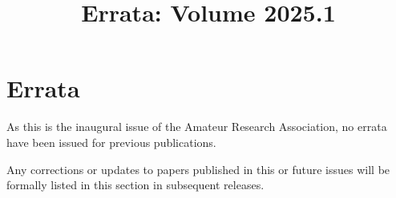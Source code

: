 \documentclass[conference, compsoc, 11pt]{IEEEtran}
\title{Errata: Volume 2025.1}
\author{
    \IEEEauthorblockN{Ivan Anishchuk}
    \IEEEauthorblockA{
        Editor-in-Chief, Amateur Research Association\\
        ORCID \orcidicon{0000-0000-0000-0000}: 0000-0000-0000-0000 %
    }
}
\begin{document}
\IEEEoverridecommandlockouts
{}

\maketitle

\IEEEpubidadjcol

\section*{Errata}

As this is the inaugural issue of the Amateur Research Association, no errata have been issued for previous publications.

Any corrections or updates to papers published in this or future issues will be formally listed in this section in subsequent releases.
\end{document}
